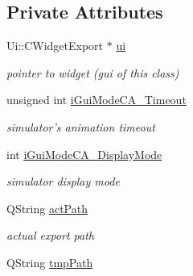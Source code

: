 \subsection*{Private Attributes}
\begin{DoxyCompactItemize}
\item 
\hypertarget{classCWidgetExport_a6ad5a4c39aa02441307e66d785453883}{
Ui::CWidgetExport $\ast$ \hyperlink{classCWidgetExport_a6ad5a4c39aa02441307e66d785453883}{ui}}
\label{classCWidgetExport_a6ad5a4c39aa02441307e66d785453883}

\begin{DoxyCompactList}\small\item\em pointer to widget (gui of this class) \item\end{DoxyCompactList}\item 
\hypertarget{classCWidgetExport_ae38b74b612c0259d5c2ca992607b41de}{
unsigned int \hyperlink{classCWidgetExport_ae38b74b612c0259d5c2ca992607b41de}{iGuiModeCA\_\-Timeout}}
\label{classCWidgetExport_ae38b74b612c0259d5c2ca992607b41de}

\begin{DoxyCompactList}\small\item\em simulator's animation timeout \item\end{DoxyCompactList}\item 
\hypertarget{classCWidgetExport_ad7a9df4a727385877d12012fa67bd954}{
int \hyperlink{classCWidgetExport_ad7a9df4a727385877d12012fa67bd954}{iGuiModeCA\_\-DisplayMode}}
\label{classCWidgetExport_ad7a9df4a727385877d12012fa67bd954}

\begin{DoxyCompactList}\small\item\em simulator display mode \item\end{DoxyCompactList}\item 
\hypertarget{classCWidgetExport_ad11e1f9a93768ad9744382404225badf}{
QString \hyperlink{classCWidgetExport_ad11e1f9a93768ad9744382404225badf}{actPath}}
\label{classCWidgetExport_ad11e1f9a93768ad9744382404225badf}

\begin{DoxyCompactList}\small\item\em actual export path \item\end{DoxyCompactList}\item 
\hypertarget{classCWidgetExport_a5a17e8aff24df770c68e7353e1d64ad3}{
QString \hyperlink{classCWidgetExport_a5a17e8aff24df770c68e7353e1d64ad3}{tmpPath}}
\label{classCWidgetExport_a5a17e8aff24df770c68e7353e1d64ad3}


\end{DoxyCompactItemize}
